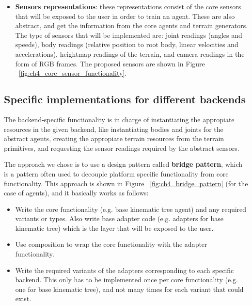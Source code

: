 \begin{itemize}
        \figFrameworkCoreTerrain

    \item \textbf{Sensors representations}: these representations consist of the core sensors that will be exposed
          to the user in order to train an agent. These are also abstract, and get the information from the
          core agents and terrain generators. The type of sensors that will be implemented are: joint readings (angles 
          and speeds), body readings (relative position to root body, linear velocities and accelerations), 
          heightmap readings of the terrain, and camera readings in the form of RGB frames. The proposed sensors are shown
          in Figure ~\ref{fig:ch4_core_sensor_functionality}.

        \figFrameworkCoreSensor
\end{itemize}

\subsection{Specific implementations for different backends}


The backend-specific functionality is in charge of instantiating the appropiate 
resources in the given backend, like instantiating bodies and joints for the abstract 
agents, creating the appropiate terrain resources from the terrain primitives, and requesting
the sensor readings required by the abstract sensors.

The approach we chose is to use a design pattern called \textbf{bridge pattern}, which
is a pattern often used to decouple platform specific functionality from core functionality.
This approach is shown in Figure ~\ref{fig:ch4_bridge_pattern} (for the case of agents), 
and it basically works as follows:

\begin{itemize}
    \item Write the core functionality (e.g. base kinematic tree agent) and any
          required variants or types. Also write base adapter code (e.g. adapters for base kinematic tree)
          which is the layer that will be exposed to the user.
    \item Use composition to wrap the core functionality with the adapter functionality.
    \item Write the required variants of the adapters corresponding to each specific backend.
          This only has to be implemented once per core functionality (e.g. one for base kinematic tree),
          and not many times for each variant that could exist.
\end{itemize}


